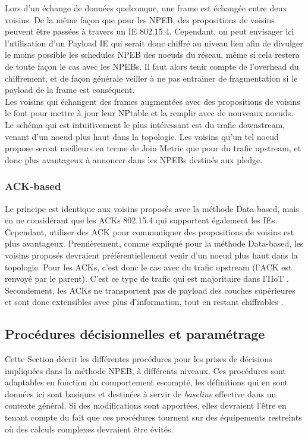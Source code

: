 \documentclass[]{report}
\begin{document}
Lors d'un échange de données quelconque, une frame est échangée entre deux voisins. De la même façon que pour les NPEB, des propositions de voisins peuvent être passées à travers un IE 802.15.4. Cependant, on peut envisager ici l'utilisation d'un Payload IE qui serait donc chiffré au niveau lien afin de divulger le moins possible les schedules NPEB des noeuds du réseau, même si cela restera de toute façon le cas avec les NPEBs. Il faut alors tenir compte de l'overhead du chiffrement, et de façon générale veiller à ne pas entrainer de fragmentation si le payload de la frame est conséquent.\\

Les voisins qui échangent des frames augmentées avec des propositions de voisins le font pour mettre à jour leur NPtable et la remplir avec de nouveaux noeuds. Le schéma qui est intuitivement le plus intéressant est du trafic downstream, venant d'un noeud plus haut dans la topologie. Les voisins qu'un tel noeud propose seront meilleurs en terme de Join Metric que pour du trafic upstream, et donc plus avantageux à annoncer dans les NPEBs destinés aux pledge.

\subsubsection{ACK-based}

Le principe est identique aux voisins proposés avec la méthode Data-based, mais en ne considérant que les ACKs 802.15.4 qui supportent également les IEs. Cependant, utiliser des ACK pour communiquer des propositions de voisins est plus avantageux. Premièrement, comme expliqué pour la méthode Data-based, les voisins proposés devraient préférentiellement venir d'un noeud plus haut dans la topologie. Pour les ACKs, c'est donc le cas avec du trafic upstream (l'ACK est renvoyé par le parent). C'est ce type de trafic qui est majoritaire dans l'IIoT \cite{openbenchmark}. Secondement, les ACKs ne transportent pas de payload des couches supérieures et sont donc extensibles avec plus d'information, tout en restant chiffrables \cite{IEEE802.15.4}.

\subsection{Procédures décisionnelles et paramétrage}
\label{decisional}

Cette Section décrit les différentes procédures pour les prises de décisions impliquées dans la méthode NPEB, à différents niveaux. Ces procédures sont adaptables en fonction du comportement escompté, les définitions qui en sont données ici sont basiques et destinées à servir de \textit{baseline} effective dans un contexte général. Si des modifications sont apportées, elles devraient l'être en tenant compte du fait que ces procédures tournent sur des équipements restreints où des calculs complexes devraient être évités.
\end{document}

